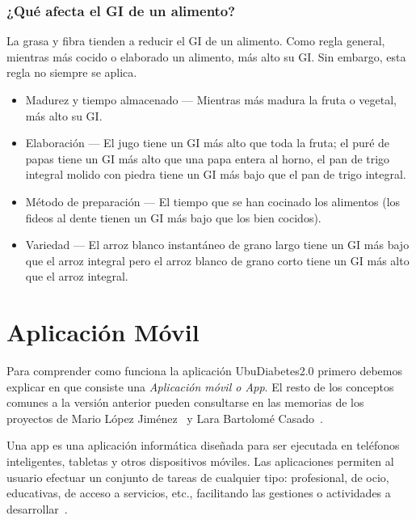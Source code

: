 \subsubsection{¿Qué afecta el GI de un alimento?}
La grasa y fibra tienden a reducir el GI de un alimento. Como regla general, mientras más cocido o elaborado un alimento, más alto su GI. Sin embargo, esta regla no siempre se aplica.
\begin{itemize}
	\item Madurez y tiempo almacenado — Mientras más madura la fruta o vegetal, más alto su GI.
	\item Elaboración — El jugo tiene un GI más alto que toda la fruta; el puré de papas tiene un GI más alto que una papa entera al horno, el pan de trigo integral molido con piedra tiene un GI más bajo que el pan de trigo integral.
	\item Método de preparación — El tiempo que se han cocinado los alimentos (los fideos al dente tienen un GI más bajo que los bien cocidos).
	\item Variedad — El arroz blanco instantáneo de grano largo tiene un GI más bajo que el arroz integral pero el arroz blanco de grano corto tiene un GI más alto que el arroz integral.
\end{itemize}

\section{Aplicación Móvil}
Para comprender como funciona la aplicación UbuDiabetes2.0 primero debemos explicar en que consiste una \textit{Aplicación móvil o App}. El resto de los conceptos comunes a la versión anterior pueden consultarse en las memorias de los proyectos de Mario López Jiménez~\cite{mario2016} y Lara Bartolomé Casado~\cite{larab2015}.

Una app es una aplicación informática diseñada para ser ejecutada en teléfonos inteligentes, tabletas y otros dispositivos móviles. Las aplicaciones permiten al usuario efectuar un conjunto de tareas de cualquier tipo: profesional, de ocio, educativas, de acceso a servicios, etc., facilitando las gestiones o actividades a desarrollar~\cite{wiki:app}.

